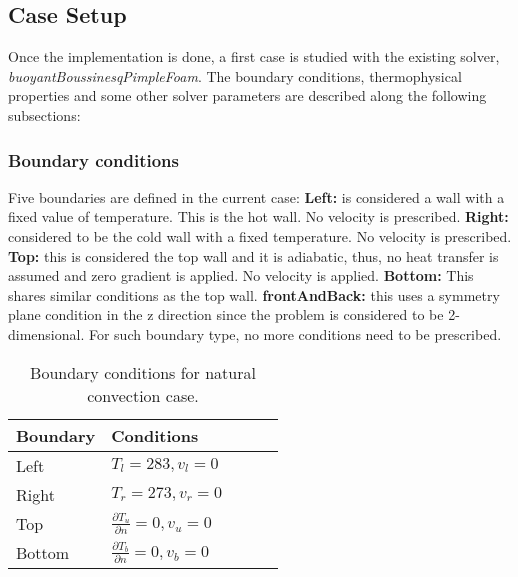 \subsection{Case Setup}
Once the implementation is done, a first case is studied with the existing solver, \textit{buoyantBoussinesqPimpleFoam}. 
The boundary conditions, thermophysical properties and some other solver parameters are described along the following subsections:
\subsubsection*{Boundary conditions}
Five boundaries are defined in the current case:
\newline
\textbf{Left:} is considered a wall with a fixed value of temperature. This is the hot wall. No velocity is prescribed.
\newline
\textbf{Right:} considered to be the cold wall with a fixed temperature. No velocity is prescribed.
\newline
\textbf{Top:} this is considered the top wall and it is adiabatic, thus, no heat transfer is assumed and zero gradient is applied. No velocity is applied.
\newline 
\textbf{Bottom:} This shares similar conditions as the top wall.
\newline
\textbf{frontAndBack:} this uses a symmetry plane condition in the z direction since the problem is considered to be 2-dimensional. For such boundary type, no more conditions need to be prescribed.
\begin{table}[h!]
	\begin{tabular}{@{}lllll@{}}
		\toprule[1pt]
		\textbf{Boundary} & \textbf{Conditions}  \\ \midrule[2pt]
		Left & $T_{l}=283, v_{l} = 0   $  \\
		Right & $T_{r}=273, v_{r} = 0 $ \\
		Top & $\frac{\partial T_{u}}{\partial n} = 0, v_{u} = 0$  \\
		Bottom & $\frac{\partial T_{b}}{\partial n} = 0, v_{b} = 0$  \\ \bottomrule[1pt]		
	\end{tabular}
	\centering
	\caption{Boundary conditions for natural convection case.}	
	\label{fig:boundaryCdsNaturalConvection}
\end{table}


